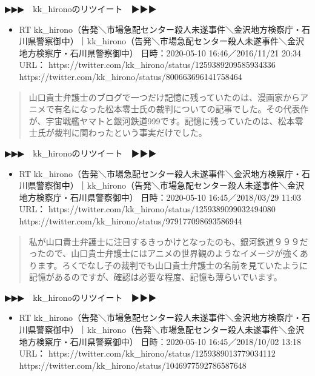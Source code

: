 \documentclass[]{ltjarticle}
\providecommand{\tightlist}{%
  \setlength{\itemsep}{0pt}\setlength{\parskip}{0pt}}
\begin{document}
▶▶▶　kk\_hironoのリツイート　▶▶▶

\begin{itemize}
\tightlist
\item
  RT
  kk\_hirono（告発＼市場急配センター殺人未遂事件＼金沢地方検察庁・石川県警察御中）｜kk\_hirono（告発＼市場急配センター殺人未遂事件＼金沢地方検察庁・石川県警察御中）
  日時：2020-05-10 16:46／2016/11/21 20:34 URL：
  https://twitter.com/kk\_hirono/status/1259389209585934336
  https://twitter.com/kk\_hirono/status/800663696141758464
\end{itemize}

\begin{quote}
山口貴士弁護士のブログで一つだけ記憶に残っていたのは、漫画家からアニメで有名になった松本零士氏の裁判についての記事でした。その代表作が、宇宙戦艦ヤマトと銀河鉄道999です。記憶に残っていたのは、松本零士氏が裁判に関わったという事実だけでした。
\end{quote}

▶▶▶　kk\_hironoのリツイート　▶▶▶

\begin{itemize}
\tightlist
\item
  RT
  kk\_hirono（告発＼市場急配センター殺人未遂事件＼金沢地方検察庁・石川県警察御中）｜kk\_hirono（告発＼市場急配センター殺人未遂事件＼金沢地方検察庁・石川県警察御中）
  日時：2020-05-10 16:45／2018/03/29 11:03 URL：
  https://twitter.com/kk\_hirono/status/1259389099032494080
  https://twitter.com/kk\_hirono/status/979177098693586944
\end{itemize}

\begin{quote}
私が山口貴士弁護士に注目するきっかけとなったのも、銀河鉄道９９９だったので、山口貴士弁護士にはアニメの世界観のようなイメージが強くあります。ろくでなし子の裁判でも山口貴士弁護士の名前を見ていたように記憶があるのですが、確認は必要な程度、記憶も薄らいでいます。
\end{quote}

▶▶▶　kk\_hironoのリツイート　▶▶▶

\begin{itemize}
\tightlist
\item
  RT
  kk\_hirono（告発＼市場急配センター殺人未遂事件＼金沢地方検察庁・石川県警察御中）｜kk\_hirono（告発＼市場急配センター殺人未遂事件＼金沢地方検察庁・石川県警察御中）
  日時：2020-05-10 16:45／2018/10/02 13:18 URL：
  https://twitter.com/kk\_hirono/status/1259389013779034112
  https://twitter.com/kk\_hirono/status/1046977592786587648
\end{itemize}
\end{document}
